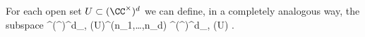 For each open set $U \subset (\CC^\times)^d$ we can define, in a completely analogous way, the subspace
\ben
\sF^{(\CC^\times)^d}_{\fg, \theta} (U)^{(n_1,\ldots,n_d)} \subset \sF^{(\CC^\times)^d}_{\fg, \theta} (U) .
\een 




%
%
%
